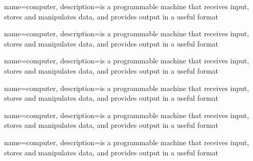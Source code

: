  {

 name=computer,
 description={is a programmable machine that receives input,
              stores and manipulates data, and provides
              output in a useful format}

}

 {

 name=computer,
 description={is a programmable machine that receives input,
              stores and manipulates data, and provides
              output in a useful format}

}

 {

 name=computer,
 description={is a programmable machine that receives input,
              stores and manipulates data, and provides
              output in a useful format}

}

 {

 name=computer,
 description={is a programmable machine that receives input,
              stores and manipulates data, and provides
              output in a useful format}

}

 {

 name=computer,
 description={is a programmable machine that receives input,
              stores and manipulates data, and provides
              output in a useful format}

}

 {

 name=computer,
 description={is a programmable machine that receives input,
              stores and manipulates data, and provides
              output in a useful format}

}